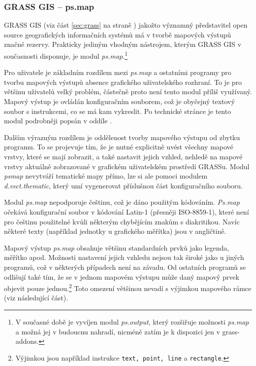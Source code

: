 \documentclass[a4paper,12pt,draft]{article}
\newcommand{\modul}[1]{\emph{#1}}
\newcommand{\instr}[1]{\lstinline[style=psmapInline]|#1|}
\begin{document}
\subsubsection{GRASS GIS -- ps.map}
\label{sec:porovnani:psmap}
GRASS GIS (viz část \ref{sec:grass} na straně \pageref{sec:grass})
jakožto významný představitel open source geografických informačních
systémů má v tvorbě mapových výstupů značné rezervy. Prakticky
jediným vhodným nástrojem, kterým GRASS GIS v současnosti disponuje,
je modul \modul{ps.map}.\footnote{V současné době je vyvíjen modul
\modul{ps.output}, který rozšiřuje možnosti \modul{ps.map} a možná
jej v budoucnu nahradí, nicméně zatím je k dispozici jen v grass-addons.}

Pro uživatele je základním rozdílem mezi \modul{ps.map} a ostatními
programy pro tvorbu mapových výstupů  absence grafického uživatelského
rozhraní. To je pro většinu uživatelů velký problém, částečně
proto není tento modul příliš využívaný. Mapový výstup je ovládán
konfiguračním souborem, což je obyčejný textový soubor s instrukcemi,
co se má kam vykreslit. Po technické stránce je tento modul podrobněji
popsán v oddíle .

Dalším výrazným rozdílem je oddělenost tvorby mapového výstupu od
zbytku programu. To se projevuje tím, že je nutné explicitně uvést
všechny mapové vrstvy, které se mají zobrazit, a také nastavit jejich
vzhled, nehledě na mapové vrstvy aktuálně zobrazované  v grafickém
uživatelském prostředí GRASSu. Modul \modul{psmap} nevytváří
tematické mapy přímo, lze si ale pomoci modulem \emph{d.vect.thematic},
který umí vygenerovat příslušnou část konfiguračního souboru.

Modul \modul{ps.map} nepodporuje češtinu, což je dáno použitým
kódováním. \modul{Ps.map} očekává konfigurační soubor v kódování
Latin-1 (přesněji ISO-8859-1), které není pro češtinu použitelné
kvůli některým chybějícím znakům s diakritikou. Navíc některé texty
(například jednotky u grafického měřítka) jsou v angličtině.

Mapový výstup \modul{ps.map} obsahuje většinu standardních prvků jako
legenda, měřítko apod. Možnosti nastavení jejich vzhledu nejsou tak
široké jako u jiných programů, což v některých případech není na závadu. Od
ostatních programů se odlišují také tím, že se v jednom mapovém výstupu může
daný mapový prvek objevit pouze jednou.\footnote{Výjimkou jsou například
instrukce \instr{text, point, line} a \instr{rectangle}.} Toto omezení většinou
nevadí s výjimkou mapového rámce (viz následující část). 
\end{document}
